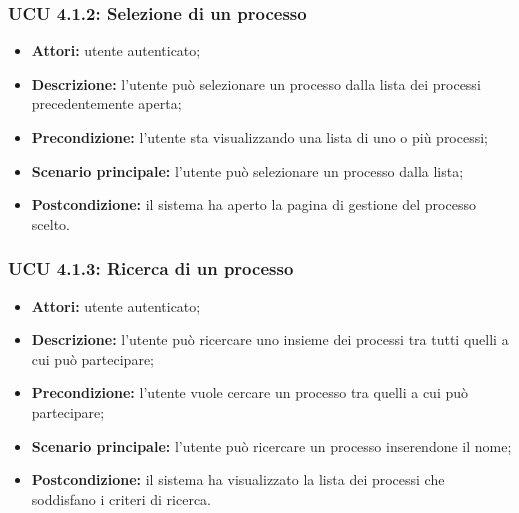 \subsubsection{UCU 4.1.2: Selezione di un processo}
\begin{itemize}
\item \textbf{Attori:} utente autenticato;
\item \textbf{Descrizione:} l'utente può selezionare un processo dalla lista dei processi precedentemente aperta;
\item \textbf{Precondizione:} l'utente sta visualizzando una lista di uno o più processi;
\item \textbf{Scenario principale:} l'utente può selezionare un processo dalla lista;
\item \textbf{Postcondizione:} il sistema ha aperto la pagina di gestione del processo scelto.
\end{itemize}

\subsubsection{UCU 4.1.3: Ricerca di un processo}
\begin{itemize}
\item \textbf{Attori:} utente autenticato;
\item \textbf{Descrizione:} l'utente può ricercare uno insieme dei processi tra tutti quelli a cui può partecipare;
\item \textbf{Precondizione:} l'utente vuole cercare un processo tra quelli a cui può partecipare;
\item \textbf{Scenario principale:} l'utente può ricercare un processo inserendone il nome;
\item \textbf{Postcondizione:} il sistema ha visualizzato la lista dei processi che soddisfano i criteri di ricerca.
\end{itemize}


